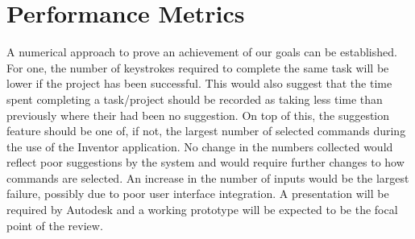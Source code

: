 \documentclass[onecolumn, draftclsnofoot,10pt, compsoc]{IEEEtran}
\begin{document}
\section{Performance Metrics}

A numerical approach to prove an achievement of our goals can be established. For one, the number of keystrokes required to complete the same task will be lower if the project has been successful. This would also suggest that the time spent completing a task/project should be recorded as taking less time than previously where their had been no suggestion. On top of this, the suggestion feature should be one of, if not, the largest number of selected commands during the use of the Inventor application. No change in the numbers collected would reflect poor suggestions by the system and would require further changes to how commands are selected. An increase in the number of inputs would be the largest failure, possibly due to poor user interface integration. A presentation will be required by Autodesk and a working prototype will be expected to be the focal point of the review.
\end{document}
